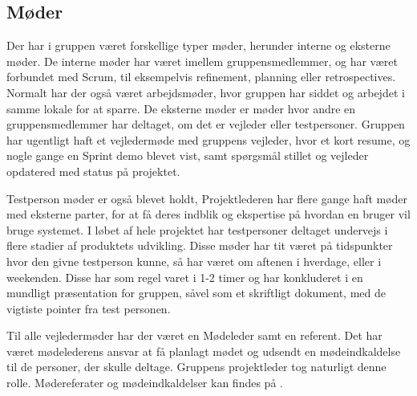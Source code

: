 \subsection{Møder}

Der har i gruppen været forskellige typer møder, herunder interne og eksterne møder. De interne møder har været imellem gruppensmedlemmer, og har været forbundet med Scrum, til eksempelvis refinement, planning eller retrospectives. Normalt har der også været arbejdsmøder, hvor gruppen har siddet og arbejdet i samme lokale for at sparre. De eksterne møder er møder hvor andre en gruppensmedlemmer har deltaget, om det er vejleder eller testpersoner. Gruppen har ugentligt haft et vejledermøde med gruppens vejleder, hvor et kort resume, og nogle gange en Sprint demo blevet vist, samt spørgsmål stillet og vejleder opdatered med status på projektet.

Testperson møder er også blevet holdt, Projektlederen har flere gange haft møder med eksterne parter, for at få deres indblik og ekspertise på hvordan en bruger vil bruge systemet. I løbet af hele projektet har testpersoner deltaget undervejs i flere stadier af produktets udvikling. Disse møder har tit været på tidspunkter hvor den givne testperson kunne, så har været om aftenen i hverdage, eller i weekenden. Disse har som regel varet i 1-2 timer og har konkluderet i en mundligt præsentation for gruppen, såvel som et skriftligt dokument, med de vigtiste pointer fra test personen.

Til alle vejledermøder har der været en Mødeleder samt en referent. Det har været mødelederens ansvar at få planlagt mødet og udsendt en mødeindkaldelse til de personer, der skulle deltage. Gruppens projektleder tog naturligt denne rolle. Mødereferater og mødeindkaldelser kan findes på .